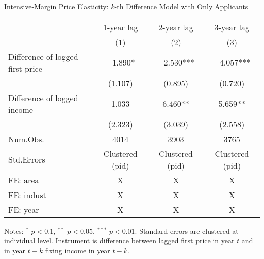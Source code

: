 \documentclass[
  ignorenonframetext,
  aspectratio=169,
]{beamer}
\begin{document}
\begin{frame}{Intensive-Margin Price Elasticity: \(k\)-th Difference Model with Only Applicants}
\protect\hypertarget{intensive-margin-price-elasticity-k-th-difference-model-with-only-applicants}{}
\begin{table}
\centering
\fontsize{8}{10}\selectfont
\begin{threeparttable}
\begin{tabular}[t]{lccc}
\toprule
\multicolumn{1}{c}{ } & \multicolumn{1}{c}{1-year lag} & \multicolumn{1}{c}{2-year lag} & \multicolumn{1}{c}{3-year lag} \\
\cmidrule(l{3pt}r{3pt}){2-2} \cmidrule(l{3pt}r{3pt}){3-3} \cmidrule(l{3pt}r{3pt}){4-4}
  & (1) & (2) & (3)\\
\midrule
Difference of logged first price & \num{-1.890}* & \num{-2.530}*** & \num{-4.057}***\\
 & (\num{1.107}) & (\num{0.895}) & (\num{0.720})\\
Difference of logged income & \num{1.033} & \num{6.460}** & \num{5.659}**\\
 & (\num{2.323}) & (\num{3.039}) & (\num{2.558})\\
\midrule
Num.Obs. & \num{4014} & \num{3903} & \num{3765}\\
Std.Errors & Clustered (pid) & Clustered (pid) & Clustered (pid)\\
FE: area & X & X & X\\
FE: indust & X & X & X\\
FE: year & X & X & X\\
\bottomrule
\end{tabular}
\begin{tablenotes}
\item Notes: $^{*}$ $p < 0.1$, $^{**}$ $p < 0.05$, $^{***}$ $p < 0.01$. Standard errors are clustered at individual level. Instrument is difference between lagged first price in year $t$ and in year $t - k$ fixing income in year $t - k$.
\end{tablenotes}
\end{threeparttable}
\end{table}
\end{frame}
\end{document}
